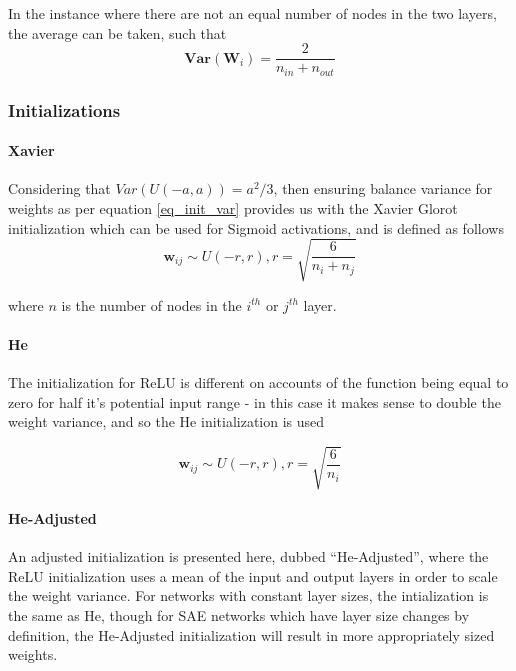 \documentclass[a4paper,11pt,oneside]{article}
\theoremstyle{plain}
\theoremstyle{definition}
\begin{document}
In the instance where there are not an equal number of nodes in the two layers, the average can be taken, such that
 \begin{equation}\label{eq_init_var}
\mathbf{Var}(\mathbf{W}_i) = \frac{2}{n_{in} + n_{out}}
\end{equation}

\subsubsection{Initializations}

\paragraph{Xavier} Considering that  $Var(U(-a, a)) = a^2/3$, then ensuring balance variance for weights as per equation \eqref{eq_init_var} provides us with the Xavier Glorot initialization \cite{Glorot} which can be used for Sigmoid activations, and is defined as follows
\begin{equation}
\mathbf{w}_{ij} \sim U(-r, r), r = \sqrt{\frac{6}{n_i + n_j}}
\end{equation}

where $n$ is the number of nodes in the $i^{th}$ or $j^{th}$ layer.
\newline\newline
\paragraph{He} The initialization for ReLU is different on accounts of the function being equal to zero for half it's potential input range - in this case it makes sense to double the weight variance, and so the He \cite{He} initialization is used

\begin{equation}
\mathbf{w}_{ij} \sim U(-r, r), r = \sqrt{\frac{6}{n_i}}
\end{equation}


\paragraph{He-Adjusted} An adjusted initialization is presented here, dubbed ``He-Adjusted'', where the ReLU initialization uses a mean of the input and output layers in order to scale the weight variance. For networks with constant layer sizes, the intialization is the same as He, though for SAE networks which have layer size changes by definition, the He-Adjusted initialization will result in more appropriately sized weights.
\end{document}
